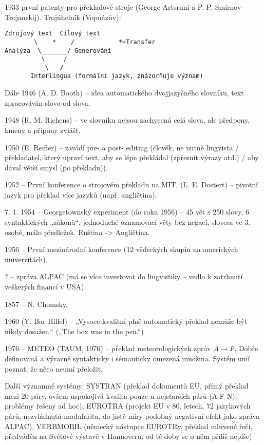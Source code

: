 \documentclass[12pt]{article}					%
\begin{document}
\begin{poznamka}[Prehistorie]
	1933 první patenty pro překladové stroje (George Artsruni a P. P. Smirnov-Trojanskij). Trojúhelník (Vopuázův):
\begin{verbatim}
Zdrojový text  Cílový text
        \    *    /            *=Transfer
Analýza  \_______/ Generování
          \     /
           \   /
       Interlingua (formální jazyk, znázorňuje význam)
\end{verbatim}

	Dále 1946 (A. D. Booth) – idea automatického dvojjazyčného slovníku, text zpracováván slovo od slova.

	1948 (R. M. Richens) – ve slovníku nejsou zachycená celá slova, ale předpony, kmeny a přípony zvlášť.

	1950 (E. Reifler) – zavádí pre- a post- editing (člověk, ne nutně lingvista / překladatel, který upraví text, aby se lépe překládal (zpřesnit výrazy atd.) / aby dával větší smysl (po překladu)).

	1952 – První konference o strojovém překladu na MIT, (L. E. Dostert) – pivotní jazyk pro překlad více jazyků (např. angličtina).

	7. 1. 1954 – Georgetownský experiment (do roku 1956) – 45 vět s 250 slovy, 6 syntaktických „zákonů“, jednoduché oznamovací věty bez negací, slovesa ve 3. osobě, málo předložek. Ruština -> Angličtina.

	1956 – První mezinárodní konference (12 vědeckých skupin na amerických univerzitách).

	? – zpráva ALPAC (má se více investovat do lingvistiky – vedlo k zatrhnutí veškerých financí v USA).

	1857 – N. Chomsky.

	1960 (Y. Bar Hillel) – „Vysoce kvalitní plně automatický překlad nemůže být nikdy dosažen.“ („The box was in the pen.“)

	1976 – METEO (TAUM, 1976) – překlad meteorologických zpráv $A \to  F$. Dobře definovaná a výrazně syntakticky i sémanticky omezená množina. Systém umí poznat, že něco neumí přeložit.

	Další významné systémy: SYSTRAN (překlad dokumentů EU, přímý překlad mezi 20 páry, ovšem uspokojivá kvalita pouze u nejstarších párů (A-F-N), problémy řešeny ad hoc), EUROTRA (projekt EU v 80. letech, 72 jazykových párů, nezvládnutá modularita, do jisté míry podobný negativní efekt jako zpráva ALPAC), VERBMOBIL (německý nástupce EUROTRy, překlad mluvené řeči, předváděn na Světové výstavě v Hannoveru, od té doby se o něm příliš nepíše)
\end{poznamka}
\end{document}
